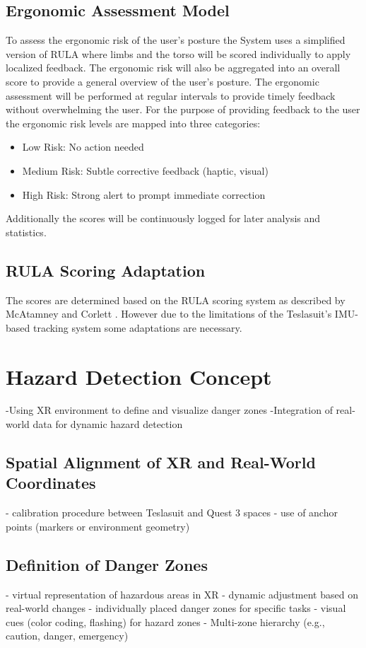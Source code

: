 \subsection{Ergonomic Assessment Model}
To assess the ergonomic risk of the user's posture the System uses a simplified version of RULA where limbs and the torso will be scored individually to apply localized feedback. The ergonomic risk will also be aggregated into an overall score to provide a general overview of the user's posture. The ergonomic assessment will be performed at regular intervals to provide timely feedback without overwhelming the user.
For the purpose of providing feedback to the user the ergonomic risk levels are mapped into three categories:
\begin{itemize}
    \item Low Risk: No action needed
    \item Medium Risk: Subtle corrective feedback (haptic, visual)
    \item High Risk: Strong alert to prompt immediate correction
\end{itemize}
Additionally the scores will be continuously logged for later analysis and statistics.
\subsection{RULA Scoring Adaptation}
The scores are determined based on the RULA scoring system as described by McAtamney and Corlett \cite{mcatamney1993rula}. However due to the limitations of the Teslasuit's IMU-based tracking system some adaptations are necessary. 

\section{Hazard Detection Concept}

-Using XR environment to define and visualize danger zones
-Integration of real-world data for dynamic hazard detection

\subsection{Spatial Alignment of XR and Real-World Coordinates}
- calibration procedure between Teslasuit and Quest 3 spaces
- use of anchor points (markers or environment geometry)

\subsection{Definition of Danger Zones}
- virtual representation of hazardous areas in XR
- dynamic adjustment based on real-world changes
- individually placed danger zones for specific tasks
- visual cues (color coding, flashing) for hazard zones
- Multi-zone hierarchy (e.g., caution, danger, emergency)

